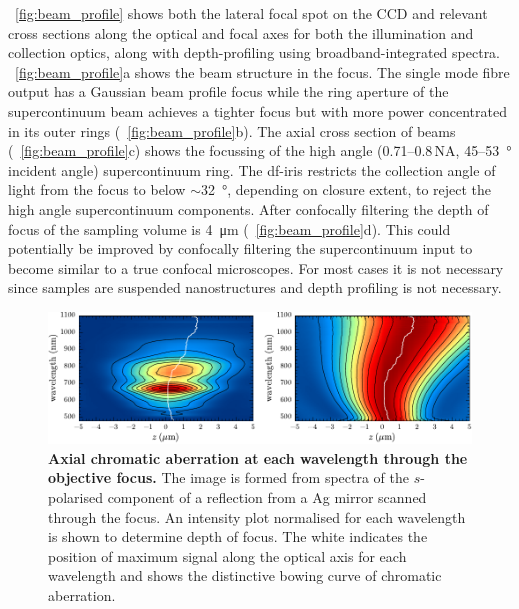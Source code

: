 \documentclass{article}
\begin{document}
\figurename~\ref{fig:beam_profile} shows both the lateral focal spot on the CCD and relevant cross sections along the optical and focal axes for both the illumination and collection optics, along with depth-profiling using broadband-integrated spectra. \figurename~\ref{fig:beam_profile}a shows the beam structure in the focus. The single mode fibre output has a Gaussian beam profile focus while the ring aperture of the supercontinuum beam achieves a tighter focus but with more power concentrated in its outer rings (\figurename~\ref{fig:beam_profile}b). The axial cross section of beams (\figurename~\ref{fig:beam_profile}c) shows the focussing of the high angle (0.71--0.8\,NA, 45--\SI{53}{\degree} incident angle) supercontinuum ring. The \gls{df}-iris restricts the collection angle of light from the focus to below $\sim$\SI{32}{\degree}, depending on closure extent, to reject the high angle supercontinuum components. After confocally filtering the depth of focus of the sampling volume is \SI{4}{\micro\metre} (\figurename~\ref{fig:beam_profile}d).
This could potentially be improved by confocally filtering the supercontinuum input to become similar to a true confocal microscopes. For most cases it is not necessary since samples are suspended nanostructures and depth profiling is not necessary.

\begin{figure}[bt]
\centering
\includegraphics{figures/axial_chromatic_aberration} %
\caption[Axial chromatic aberration at each wavelength through the objective focus]{\textbf{Axial chromatic aberration at each wavelength through the objective focus.} The image is formed from spectra of the $s$-polarised component of a reflection from a Ag mirror scanned through the focus. An intensity plot normalised for each wavelength is shown to determine depth of focus. The white indicates the position of maximum signal along the optical axis for each wavelength and shows the distinctive bowing curve of chromatic aberration.
}
\label{fig:axial_chromatic_aberration}
\vspace{-5pt}
\end{figure}
\end{document}
